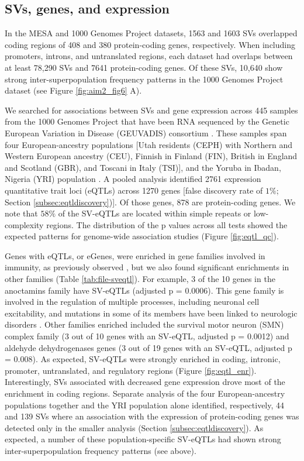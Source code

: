 \documentclass[11pt]{ucscthesis}
\begin{document}
\subsection{SVs, genes, and expression}
In the MESA and 1000 Genomes Project datasets, 1563 and 1603 SVs overlapped coding regions of 408 and 380 protein-coding genes, respectively.
When including promoters, introns, and untranslated regions, each dataset had overlaps between at least 78,290 SVs and 7641 protein-coding genes.
Of these SVs, 10,640 show strong inter-superpopulation frequency patterns in the 1000 Genomes Project dataset (see Figure \ref{fig:aim2_fig6} A).

We searched for associations between SVs and gene expression across 445 samples from the 1000 Genomes Project that have been RNA sequenced by the Genetic European Variation in Disease (GEUVADIS) consortium \cite{geuvadis_2013}.
These samples span four European-ancestry populations [Utah residents (CEPH) with Northern and Western European ancestry (CEU), Finnish in Finland (FIN), British in England and Scotland (GBR), and Toscani in Italy (TSI)], and the Yoruba in Ibadan, Nigeria (YRI) population \cite{geuvadis_2013}.
A pooled analysis identified 2761 expression quantitative trait loci (eQTLs) across 1270 genes [false discovery rate of $1\%$; Section \ref{subsec:eqtldiscovery})].
Of those genes, 878 are protein-coding genes. We note that $58\%$ of the SV-eQTLs are located within simple repeats or low-complexity regions.
The distribution of the p values across all tests showed the expected patterns for genome-wide association studies (Figure \ref{fig:eqtl_qc}).

Genes with eQTLs, or eGenes, were enriched in gene families involved in immunity, as previously observed \cite{fagny_exploring_2017}, but we also found significant enrichments in other families (Table \ref{tab:file-sveqtl}).
For example, 3 of the 10 genes in the anoctamins family have SV-eQTLs (adjusted p = 0.0006).
This gene family is involved in the regulation of multiple processes, including neuronal cell excitability, and mutations in some of its members have been linked to neurologic disorders \cite{benarroch_2017}.
Other families enriched included the survival motor neuron (SMN) complex family (3 out of 10 genes with an SV-eQTL, adjusted p = 0.0012) and aldehyde dehydrogenases genes (3 out of 19 genes with an SV-eQTL, adjusted p = 0.008).
As expected, SV-eQTLs were strongly enriched in coding, intronic, promoter, untranslated, and regulatory regions (Figure \ref{fig:eqtl_enr}).
Interestingly, SVs associated with decreased gene expression drove most of the enrichment in coding regions.
Separate analysis of the four European-ancestry populations together and the YRI population alone identified, respectively, 44 and 139 SVs where an association with the expression of protein-coding genes was detected only in the smaller analysis (Section \ref{subsec:eqtldiscovery}).
As expected, a number of these population-specific SV-eQTLs had shown strong inter-superpopulation frequency patterns (see above).
\end{document}
